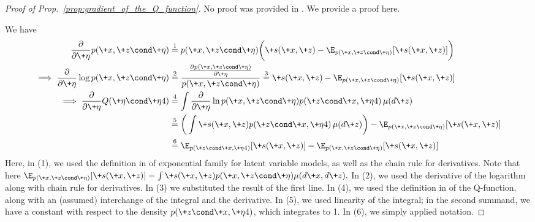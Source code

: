 \documentclass{article} %
\newcommand{\sufficientStatsFunction}{\+s}
\newcommand{\naturalParam}{\+\eta}
\begin{document}
 
\begin{proof}[Proof of Prop.~\ref{prop:gradient_of_the_Q_function}] No proof was provided in \citet{salakhutdinov2002relationship}. We provide a proof here.

We have 
\begin{align*}
\frac{\partial}{\partial \naturalParam}  p(\+x, \+z \cond \naturalParam) & \stackrel{1}{=} p(\+x, \+z \cond \naturalParam) \bigg( \sufficientStatsFunction(\+x, \+z) - \E
_{p(\+x,\+z \cond \naturalParam)} [\sufficientStatsFunction(\+x, \+z)] \bigg) \\
\implies \frac{\partial}{\partial \naturalParam}  \log p(\+x, \+z \cond \naturalParam) & \stackrel{2}{=} \frac{\frac{\partial p(\+x, \+z \cond \naturalParam)}{\partial \naturalParam}}{p(\+x, \+z \cond \naturalParam)} \stackrel{3}{=}  \sufficientStatsFunction(\+x, \+z) - \E
_{p(\+x,\+z \cond \naturalParam)} [\sufficientStatsFunction(\+x, \+z)] \\
\implies \frac{\partial}{\partial \naturalParam}  Q(\naturalParam \cond \naturalParam^^t) & \stackrel{4}{=} \int \frac{\partial}{\partial \naturalParam} \ln p(
\+x ,\+z \cond \naturalParam) p(\+z \cond \+x, \naturalParam^^t) \, \mu(d\+z) \\
& \stackrel{5}{=} \bigg( \int \sufficientStatsFunction(\+x, \+z) p(\+z \cond \+x, \naturalParam^^t) \, \mu(d\+z)\bigg) - \E
_{p(\+x,\+z \cond \naturalParam)} [\sufficientStatsFunction(\+x, \+z)]  \\
& \stackrel{6}{=} \E
_{p(\+z \cond \+x, \naturalParam^^t)} [\sufficientStatsFunction(\+x, \+z)]   - \E
_{p(\+x,\+z \cond \naturalParam)} [\sufficientStatsFunction(\+x, \+z)] 
\end{align*}
%
Here, in (1), we used the definition in  of exponential family for latent variable models, as well as the chain rule for derivatives.   Note that here $\E
_{p(\+x,\+z \cond \naturalParam)} [\sufficientStatsFunction(\+x, \+z)] =  \int \sufficientStatsFunction(\+x, \+z) p(\+x,\+z \cond \naturalParam) \mu(d\+x, d\+z).$ In (2), we used the derivative of the logarithm along with chain rule for derivatives. In (3) we substituted the result of the first line. In (4), we used the definition in 
of the Q-function, along with an (assumed) interchange of the integral and the derivative. In (5), we used linearity of the integral; in the second summand, we have a constant with respect to the density $p(\+z \cond \+x, \naturalParam^^t)$, which integrates to 1.  In (6), we simply applied notation.  
\end{proof}
\end{document}
